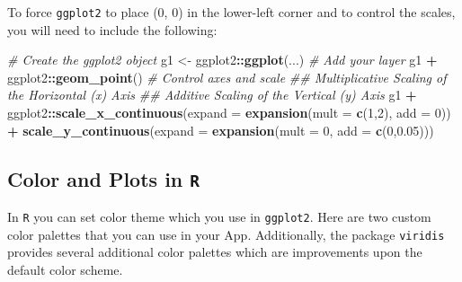 \documentclass[
]{book}
\newenvironment{Shaded}{\begin{snugshade}}{\end{snugshade}}
\newcommand{\CommentTok}[1]{\textcolor[rgb]{0.56,0.35,0.01}{\textit{#1}}}
\newcommand{\DataTypeTok}[1]{\textcolor[rgb]{0.13,0.29,0.53}{#1}}
\newcommand{\DecValTok}[1]{\textcolor[rgb]{0.00,0.00,0.81}{#1}}
\newcommand{\FloatTok}[1]{\textcolor[rgb]{0.00,0.00,0.81}{#1}}
\newcommand{\KeywordTok}[1]{\textcolor[rgb]{0.13,0.29,0.53}{\textbf{#1}}}
\newcommand{\NormalTok}[1]{#1}
\newcommand{\OperatorTok}[1]{\textcolor[rgb]{0.81,0.36,0.00}{\textbf{#1}}}
\newcommand{\StringTok}[1]{\textcolor[rgb]{0.31,0.60,0.02}{#1}}
\begin{document}
To force \texttt{ggplot2} to place (0, 0) in the lower-left corner and to control the scales, you will need to include the following:

\begin{Shaded}
\begin{Highlighting}[]
\CommentTok{# Create the ggplot2 object}
\NormalTok{g1 <-}\StringTok{ }\NormalTok{ggplot2}\OperatorTok{::}\KeywordTok{ggplot}\NormalTok{(...)}
\CommentTok{# Add your layer}
\NormalTok{g1 }\OperatorTok{+}\StringTok{ }\NormalTok{ggplot2}\OperatorTok{::}\KeywordTok{geom_point}\NormalTok{()}
\CommentTok{# Control axes and scale}
\CommentTok{## Multiplicative Scaling of the Horizontal (x) Axis}
\CommentTok{## Additive Scaling of the Vertical (y) Axis}
\NormalTok{g1 }\OperatorTok{+}\StringTok{ }\NormalTok{ggplot2}\OperatorTok{::}\KeywordTok{scale_x_continuous}\NormalTok{(}\DataTypeTok{expand =} \KeywordTok{expansion}\NormalTok{(}\DataTypeTok{mult =} \KeywordTok{c}\NormalTok{(}\DecValTok{1}\NormalTok{,}\DecValTok{2}\NormalTok{), }\DataTypeTok{add =} \DecValTok{0}\NormalTok{)) }\OperatorTok{+}\StringTok{ }
\StringTok{  }\KeywordTok{scale_y_continuous}\NormalTok{(}\DataTypeTok{expand =} \KeywordTok{expansion}\NormalTok{(}\DataTypeTok{mult =} \DecValTok{0}\NormalTok{, }\DataTypeTok{add =} \KeywordTok{c}\NormalTok{(}\DecValTok{0}\NormalTok{,}\FloatTok{0.05}\NormalTok{))) }
\end{Highlighting}
\end{Shaded}

\hypertarget{color-and-plots-in-r}{%
\subsection{\texorpdfstring{Color and Plots in \texttt{R}}{Color and Plots in R}}\label{color-and-plots-in-r}}

In \texttt{R} you can set color theme which you use in \texttt{ggplot2}. Here are two custom color palettes that you can use in your App. Additionally, the package \texttt{viridis} provides several additional color palettes which are improvements upon the default color scheme.
\end{document}
